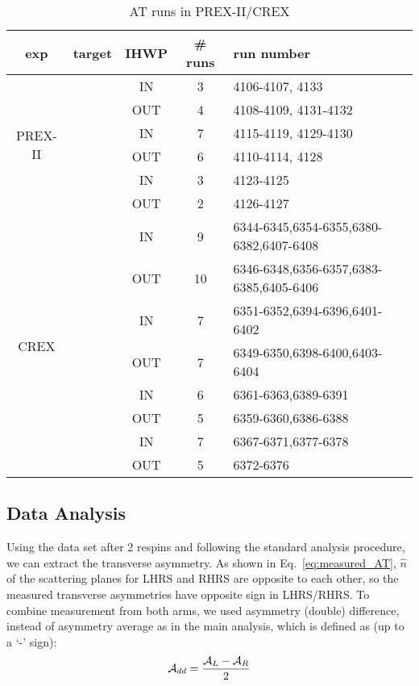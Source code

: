 \begin{table}[!h]
    \centering
    \begin{tabular}{c | c | c | c | l}
	\hline
	exp & target	& IHWP	& \# runs    & run number    \\
	\hline
	\multirow{6}{*}{PREX-II}    & \multirow{2}{*}{\C}   & IN    & 3	& 4106-4107, 4133    \\
	    &   & OUT   & 4 & 4108-4109, 4131-4132   \\
	    \cline{2-5}
	    & \multirow{2}{*}{\Pb}  & IN    & 7	& 4115-4119, 4129-4130  \\
	    &	& OUT	& 6 & 4110-4114, 4128   \\
	    \cline{2-5}
	    & \multirow{2}{*}{\ca}  & IN    & 3	& 4123-4125	\\
	    &	& OUT	& 2 & 4126-4127 \\
	\hline
	\multirow{8}{*}{CREX}	& \multirow{2}{*}{\Ca}	& IN	& 9 & 6344-6345,6354-6355,6380-6382,6407-6408\\
	    &	& OUT	& 10	& 6346-6348,6356-6357,6383-6385,6405-6406   \\
	    \cline{2-5}
	    & \multirow{2}{*}{\ca}	& IN	& 7 & 6351-6352,6394-6396,6401-6402	\\
	    &	& OUT	& 7 & 6349-6350,6398-6400,6403-6404	\\
	    \cline{2-5}
	    & \multirow{2}{*}{\C}	& IN	& 6 & 6361-6363,6389-6391	\\
	    &	& OUT	& 5 & 6359-6360,6386-6388	\\
	    \cline{2-5}
	    & \multirow{2}{*}{\Pb}	& IN	& 7 & 6367-6371,6377-6378	\\
	    &	& OUT	& 5 & 6372-6376 \\
	\hline
    \end{tabular}
    \caption{AT runs in PREX-II/CREX}
\end{table}

\subsection{Data Analysis}

Using the data set after 2 respins and following the standard analysis procedure, 
we can extract the transverse asymmetry. As shown in Eq.~\ref{eq:measured_AT},
$\hat{n}$ of the scattering planes for LHRS and RHRS are opposite to each other,
so the measured transverse asymmetries have opposite sign in LHRS/RHRS. To
combine measurement from both arms, we used asymmetry (double) difference, instead of 
asymmetry average as in the main analysis, which is defined as (up to a `-' sign):
\begin{equation}
    \mathcal{A}_{dd} = \frac{\mathcal{A}_L - \mathcal{A}_R}{2}
\end{equation}

